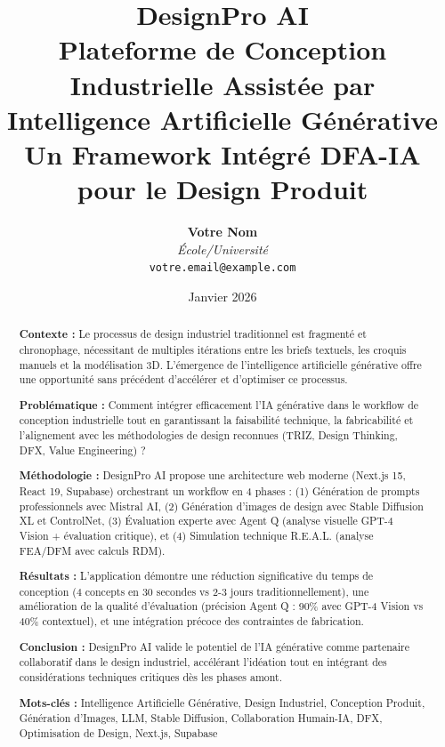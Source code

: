 \documentclass[12pt,a4paper]{article}
\title{
    \vspace{-2cm}
    \Huge\textbf{DesignPro AI}\\[0.5cm]
    \Large Plateforme de Conception Industrielle Assistée par Intelligence Artificielle Générative\\[0.3cm]
    \large Un Framework Intégré DFA-IA pour le Design Produit
}
\author{
    \textbf{Votre Nom}\\
    \textit{École/Université}\\
    \texttt{votre.email@example.com}
}
\date{Janvier 2026}
\begin{document}
\maketitle
\thispagestyle{empty}
\newpage

\begin{abstract}
\noindent
\textbf{Contexte :} Le processus de design industriel traditionnel est fragmenté et chronophage, nécessitant de multiples itérations entre les briefs textuels, les croquis manuels et la modélisation 3D. L'émergence de l'intelligence artificielle générative offre une opportunité sans précédent d'accélérer et d'optimiser ce processus.

\textbf{Problématique :} Comment intégrer efficacement l'IA générative dans le workflow de conception industrielle tout en garantissant la faisabilité technique, la fabricabilité et l'alignement avec les méthodologies de design reconnues (TRIZ, Design Thinking, DFX, Value Engineering) ?

\textbf{Méthodologie :} DesignPro AI propose une architecture web moderne (Next.js 15, React 19, Supabase) orchestrant un workflow en 4 phases : (1) Génération de prompts professionnels avec Mistral AI, (2) Génération d'images de design avec Stable Diffusion XL et ControlNet, (3) Évaluation experte avec Agent Q (analyse visuelle GPT-4 Vision + évaluation critique), et (4) Simulation technique R.E.A.L. (analyse FEA/DFM avec calculs RDM).

\textbf{Résultats :} L'application démontre une réduction significative du temps de conception (4 concepts en 30 secondes vs 2-3 jours traditionnellement), une amélioration de la qualité d'évaluation (précision Agent Q : 90\% avec GPT-4 Vision vs 40\% contextuel), et une intégration précoce des contraintes de fabrication.

\textbf{Conclusion :} DesignPro AI valide le potentiel de l'IA générative comme partenaire collaboratif dans le design industriel, accélérant l'idéation tout en intégrant des considérations techniques critiques dès les phases amont.

\vspace{0.5cm}
\noindent
\textbf{Mots-clés :} Intelligence Artificielle Générative, Design Industriel, Conception Produit, Génération d'Images, LLM, Stable Diffusion, Collaboration Humain-IA, DFX, Optimisation de Design, Next.js, Supabase
\end{abstract}
\end{document}
